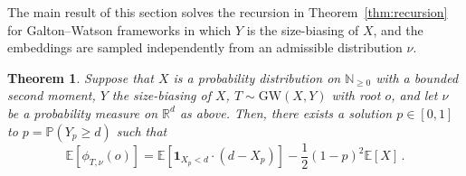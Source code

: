 \documentclass[10pt,a4paper]{amsart}
\numberwithin{equation}{section}
\newtheorem{theorem}{Theorem}[section]
\newcommand{\E}{\mathbb E}
\newcommand{\N}{\mathbb N}
\renewcommand{\P}{\mathbb P}
\newcommand{\R}{\mathbb R}
\begin{document}
The main result of this section solves the recursion in Theorem~\ref{thm:recursion} for Galton--Watson frameworks in which $Y$ is the size-biasing of $X$,
and the embeddings are sampled independently from an admissible distribution $\nu$.

\begin{theorem}\label{thm:Exp_loc_flex}
    Suppose that $X$ is a probability distribution on $\N_{\ge 0}$ with a bounded second moment, $Y$ the size-biasing of $X$, $T\sim \mathrm{GW}(X,Y)$ with root $o$, and let $\nu$ be a probability measure on $\R^d$ as above. Then, there exists a solution $p \in [0,1]$ to $p=\P(Y_p\ge d)$ such that
    \begin{equation}\label{eq:Xformula}
    \E[\phi_{T,\nu}(o)] = \E[\mathbf 1_{X_p<d}\cdot(d-X_{p})] - \frac12(1-p)^2\E[X]\,.
    \end{equation}
    
\end{theorem}
\end{document}
